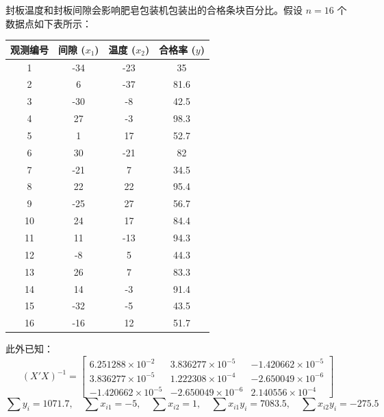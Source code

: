\begin{questions}
\question
封板温度和封板间隙会影响肥皂包装机包装出的合格条块百分比。假设 $n = 16$ 个数据点如下表所示：

\begin{center}
\begin{tabular}{c|ccc}
\hline
观测编号 & 间隙 ($x_1$) & 温度 ($x_2$) & 合格率 ($y$) \\
\hline
1 & -34 & -23 & 35 \\
2 & 6 & -37 & 81.6 \\
3 & -30 & -8 & 42.5 \\
4 & 27 & -3 & 98.3 \\
5 & 1 & 17 & 52.7 \\
6 & 30 & -21 & 82 \\
7 & -21 & 7 & 34.5 \\
8 & 22 & 22 & 95.4 \\
9 & -25 & 27 & 56.7 \\
10 & 24 & 17 & 84.4 \\
11 & 11 & -13 & 94.3 \\
12 & -8 & 5 & 44.3 \\
13 & 26 & 7 & 83.3 \\
14 & 14 & -3 & 91.4 \\
15 & -32 & -5 & 43.5 \\
16 & -16 & 12 & 51.7 \\
\hline
\end{tabular}
\end{center}

此外已知：
\[
(X'X)^{-1} = \begin{bmatrix} 6.251288 \times 10^{-2} & 3.836277 \times 10^{-5} & -1.420662 \times 10^{-5} \\ 3.836277 \times 10^{-5} & 1.222308 \times 10^{-4} & -2.650049 \times 10^{-6} \\ -1.420662 \times 10^{-5} & -2.650049 \times 10^{-6} & 2.140556 \times 10^{-4} \end{bmatrix}
\]
\[
\sum y_i = 1071.7, \quad \sum x_{i1} = -5, \quad \sum x_{i2} = 1, \quad \sum x_{i1} y_i = 7083.5, \quad \sum x_{i2} y_i = -275.5
\]

\begin{parts}

\end{parts}
\end{questions}

